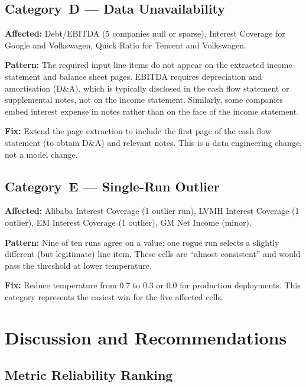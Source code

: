 \documentclass[12pt, a4paper]{article}
\begin{document}
\subsection{Category~D --- Data Unavailability}

\textbf{Affected:} Debt/EBITDA (5 companies null or sparse), Interest
Coverage for Google and Volkswagen, Quick Ratio for Tencent and Volkswagen.

\textbf{Pattern:} The required input line items do not appear on the
extracted income statement and balance sheet pages.  EBITDA requires
depreciation and amortisation (D\&A), which is typically disclosed in the
cash flow statement or supplemental notes, not on the income statement.
Similarly, some companies embed interest expense in notes rather than on
the face of the income statement.

\textbf{Fix:} Extend the page extraction to include the first page of the
cash flow statement (to obtain D\&A) and relevant notes.  This is a data
engineering change, not a model change.

\subsection{Category~E --- Single-Run Outlier}

\textbf{Affected:} Alibaba Interest Coverage (1 outlier run), LVMH Interest
Coverage (1 outlier), EM Interest Coverage (1 outlier), GM Net Income (minor).

\textbf{Pattern:} Nine of ten runs agree on a value; one rogue run selects a
slightly different (but legitimate) line item.  These cells are ``almost
consistent'' and would pass the threshold at lower temperature.

\textbf{Fix:} Reduce temperature from 0.7 to 0.3 or 0.0 for production
deployments.  This category represents the easiest win for the five affected
cells.

\section{Discussion and Recommendations}
\label{sec:discussion}

\subsection{Metric Reliability Ranking}
\end{document}
